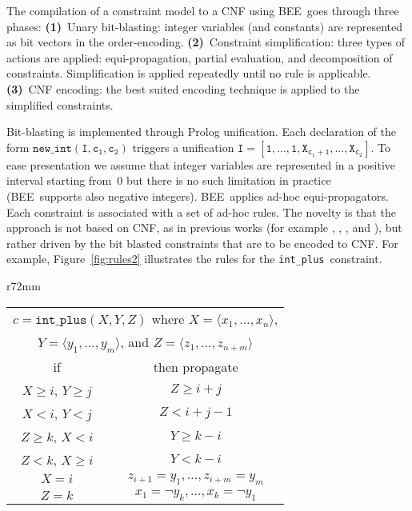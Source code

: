 \documentclass[runningheads,a4paper]{llncs}
\newcommand{\plus}{\texttt{int\_plus}}
\newcommand\tuple[1]{\langle #1 \rangle}
\newcommand{\bee}{\textsf{BEE}}
\begin{document}
The compilation of a constraint model to a CNF
using \bee\ goes through three phases:
\textbf{(1)}~Unary bit-blasting: integer variables (and constants) are
  represented as bit vectors in the order-encoding.
\textbf{(2)}~Constraint simplification: three types of actions are applied:
  equi-propagation, partial evaluation, and decomposition of
  constraints.  Simplification is applied repeatedly until no rule is
  applicable.
\textbf{(3)}~CNF encoding: the best suited encoding technique is applied to
  the simplified constraints.






Bit-blasting is implemented through Prolog unification. Each
declaration of the form $\mathtt{new\_int(I,c_1,c_2)}$ triggers a
unification $\mathtt{I=[1,\dots,1,X_{c_1+1},\ldots,X_{c_2}]}$. To ease
presentation we assume that integer variables are represented in a
positive interval starting from~$0$ but there is no such limitation in
practice (\bee\ supports also negative integers).
\bee\ applies ad-hoc equi-propagators.  Each constraint is associated
with a set of ad-hoc rules.  The novelty is that the approach is not
based on CNF, as in previous works (for example
\cite{chu-min2003}, \cite{sateliteEenB05}, 
\cite{HeuleJarvisaloBiere2011}, and \cite{Manthey2012}),
but rather driven by the bit
blasted constraints that are to be encoded to CNF.
For example, Figure~\ref{fig:rules2} illustrates the rules for the
\plus\ constraint.
\begin{wrapfigure}[12]{r}{72mm}\small
\vspace{-5mm}
\begin{tabular}{|c|c|}
\hline
  \multicolumn{2}{|c|}{\small $c=\plus(X,Y,Z)$ where $X=\tuple{x_1,\ldots,x_n}$,}\\
  \multicolumn{2}{|c|}{\small $Y=\tuple{y_1,\ldots,y_m}$, and
                                $Z=\tuple{z_1,\ldots,z_{n+m}}$}\\
\hline
  {if } & {then propagate} \\
\hline
\hline
$X\geq i$, $Y\geq j$ & $Z\geq i+j$\\
\hline
$X<i$, $Y<j$ & $Z<i+j-1$\\
\hline
$Z \geq k$, $X < i$ & $Y \geq k-i$ \\
\hline
$Z < k$, $X \geq i$ & $Y < k-i$ \\
\hline
$X=i$ & $z_{i+1}=y_1,\ldots,z_{i+m}=y_m$ \\
\hline
$Z=k$ &  $x_1=\neg y_k,\ldots,x_k=\neg y_1$ \\
\hline 
\end{tabular}
\caption{Ad-hoc rules for  $\plus$}
\label{fig:rules2}
\end{wrapfigure}
\end{document}
